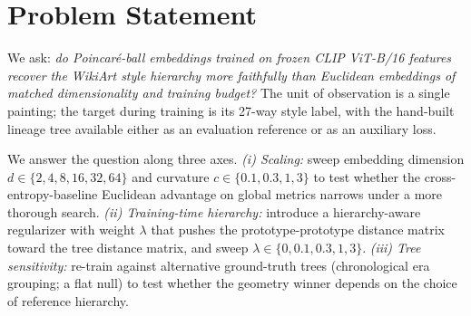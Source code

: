 \section{Problem Statement}
\label{sec:problem}

We ask: \emph{do Poincar\'e-ball embeddings trained on frozen CLIP
ViT-B/16 features recover the WikiArt style hierarchy more faithfully
than Euclidean embeddings of matched dimensionality and training
budget?} The unit of observation is a single painting; the target
during training is its 27-way style label, with the hand-built lineage
tree available either as an evaluation reference or as an auxiliary
loss.

We answer the question along three axes. \textit{(i) Scaling:} sweep
embedding dimension $d \in \{2, 4, 8, 16, 32, 64\}$ and curvature
$c \in \{0.1, 0.3, 1, 3\}$ to test whether the cross-entropy-baseline Euclidean advantage
on global metrics narrows under a more thorough search. \textit{(ii)
Training-time hierarchy:} introduce a hierarchy-aware regularizer with
weight $\lambda$ that pushes the prototype-prototype distance matrix
toward the tree distance matrix, and sweep
$\lambda \in \{0, 0.1, 0.3, 1, 3\}$. \textit{(iii) Tree sensitivity:}
re-train against alternative ground-truth trees (chronological era
grouping; a flat null) to test whether the geometry winner depends on
the choice of reference hierarchy.
